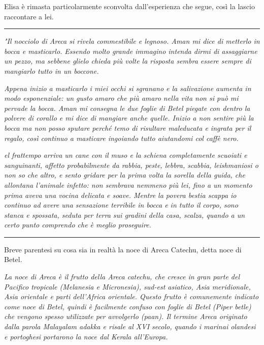 Elisa è rimasta particolarmente sconvolta dall'esperienza che segue, così la lascio raccontare a lei.

\begin{center}
    \noindent\rule{0.6\textwidth}{0.4pt}
\end{center}

\textit{"Il nocciolo di Areca si rivela commestibile e legnoso. Aman mi dice di metterlo in bocca e masticarlo. Essendo molto grande immagino intenda dirmi di assaggiarne un pezzo, ma sebbene glielo chieda più volte la risposta sembra essere sempre di mangiarlo tutto in un boccone.}

\textit{Appena inizio a masticarlo i miei occhi si sgranano e la salivazione aumenta in modo esponenziale: un gusto amaro che più amaro nella vita non si può mi pervade la bocca. Aman mi consegna le due foglie di Betel piegate con dentro la polvere di corallo e mi dice di mangiare anche quelle. Inizio a non sentire più la bocca ma non posso sputare perché temo di risultare maleducata e ingrata per il regalo, così continuo a masticare ingoiando tutto aiutandomi col caffè nero.}

\textit{el frattempo arriva un cane con il muso e la schiena completamente scuoiati e sanguinanti, affetto probabilmente da rabbia, peste, lebbra, scabbia, leishmaniosi o non so che altro, e sento gridare per la prima volta la sorella della guida, che allontana l'animale infetto: non sembrava nemmeno più lei, fino a un momento prima aveva una vocina delicata e soave. Mentre la povera bestia scappa io continuo ad avere una sensazione terribile in bocca e in tutto il corpo, sono stanca e spossata, seduta per terra sui gradini della casa, scalza, quando a un certo punto comprendo che è meglio proseguire.}

\begin{center}
    \noindent\rule{0.6\textwidth}{0.4pt}
\end{center}

Breve parentesi su cosa sia in realtà la noce di Areca Catechu, detta noce di Betel. 

\textit{La noce di Areca è il frutto della Areca catechu, che cresce in gran parte del Pacifico tropicale (Melanesia e Micronesia), sud-est asiatico, Asia meridionale, Asia orientale e parti dell'Africa orientale. Questo frutto è comunemente indicato come noce di Betel, quindi è facilmente confuso con foglie di Betel (Piper betle) che vengono spesso utilizzate per avvolgerlo (paan). Il termine Areca originato dalla parola Malayalam adakka e risale al XVI secolo, quando i marinai olandesi e portoghesi portarono la noce dal Kerala all'Europa.}

